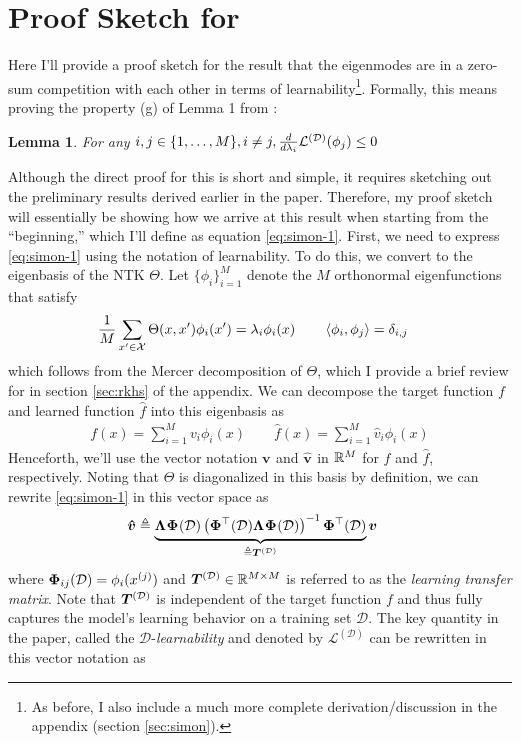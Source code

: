 \documentclass{article}
\newtheorem{lemma}[theorem]{Lemma}
\renewcommand\vec[2][]{\bm{#2}_{#1}}
\newcommand\mc{\mathcal}
\begin{document}
\section{Proof Sketch for \cite{simon2021}}

Here I'll provide a proof sketch for the result that the eigenmodes are in a zero-sum competition with each other in terms of learnability\footnote{As before, I also include a much more complete derivation/discussion in the appendix (section \ref{sec:simon}).}. Formally, this means proving the property (g) of Lemma 1 from \cite{simon2021}:
\begin{lemma}\label{lemma:simon}
	For any $i, j \in \{1, \ldots, M\}, i \neq j,  \deriv{}{\lambda_i}\mc L^{(\mc D)  }(\phi_j)  \leq 0$
\end{lemma}
Although the direct proof for this is short and simple, it requires sketching out the preliminary results derived earlier in the paper. Therefore, my proof sketch will essentially be showing how we arrive at this result when starting from the ``beginning,'' which I'll define as equation \ref{eq:simon-1}. First, we need to express \ref{eq:simon-1} using the notation of learnability. To do this, we convert to the eigenbasis of the NTK $\Theta$. Let $\{\phi_i\}_{i=1}^{M}$ denote the $M$ orthonormal eigenfunctions that satisfy 
\begin{align}
	\inv{M} \sum_{x' \in \mc X} \Theta(x, x') \phi_i(x') 
		&= \lambda_i \phi_i(x) 
	\qquad 
	\innerprod{\phi_i}{\phi_j} = \delta_{i,j}
\end{align}
which follows from the Mercer decomposition of $\Theta$, which I provide a brief review for in section \ref{sec:rkhs} of the appendix. We can decompose the target function $f$ and learned function $\hat f$ into this eigenbasis as
\begin{align}
	f(x) = \sum_{i = 1}^{M} v_i \phi_i(x) 
	\qquad 
	\hat f(x) = \sum_{i=1}^M\hat v_i \phi_i(x)
\end{align}
Henceforth, we'll use the vector notation $\vec v$ and $\vec{\hat v}$ in $\mathbb{R}^{M}$ for $f$ and $\hat f$, respectively. Noting that $\Theta$ is diagonalized in this basis by definition, we can rewrite \ref{eq:simon-1} in this vector space as 
\begin{align}
	\vec{\hat v}
		&\triangleq
		\underbrace{ \matr\Lambda \matr\Phi (\mc D)
		\lr{  \matr{\Phi}^\top(\mc D)  \matr\Lambda \matr\Phi (\mc D)  }^{-1}  \matr{\Phi}^\top (\mc D)
	}_{\triangleq \matr{T}^{(\mc D)}}
		\vec v
\end{align}
where $\matr[ij]{\Phi}(\mc D) = \phi_i(\ival[j]{x})$ and $\matr{T}^{(\mc D)} \in \R^{M \times M}$ is referred to as the \textit{learning transfer matrix}. Note that $\matr{T}^{(\mc D)}$ is independent of the target function $f$ and thus fully captures the model's learning behavior on a training set $\mc D$. The key quantity in the paper, called the $\mc D$-\textit{learnability} and denoted by $\mc L^{(\mc D)}$ can be rewritten in this vector notation as
\end{document}
